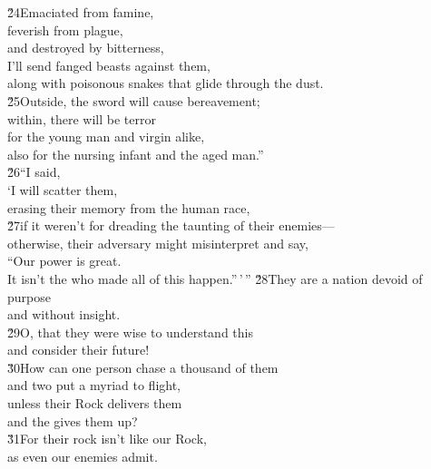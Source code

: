 \begin{poetry}
\poeml \v{24}Emaciated from famine, \\
\poemll    feverish from plague, \\
\poemll    and destroyed by bitterness, \\
\poeml I'll send fanged beasts against them, \\
\poemll    along with poisonous snakes that glide through the dust. \\
\poeml \v{25}Outside, the sword will cause bereavement; \\
\poemll    within, there will be terror \\
\poemlll       for the young man and virgin alike, \\
\poemlll       also for the nursing infant and the aged man.'' \\
\poeml \v{26}``I said, \\
\poeml `I will scatter them, \\
\poemll    erasing their memory from the human race, \\
\poeml \v{27}if it weren't for dreading the taunting of their enemies--- \\
\poemll    otherwise, their adversary might misinterpret and say, \\
\poeml ``Our power is great. \\
\poemll    It isn't the  who made all of this happen.''\,'\,''
\poeml \v{28}They are a nation devoid of purpose \\
\poemll    and without insight. \\
\poeml \v{29}O, that they were wise to understand this \\
\poemll    and consider their future! \\
\poeml \v{30}How can one person chase a thousand of them \\
\poemll    and two put a myriad to flight, \\
\poeml unless their Rock delivers them \\
\poemll    and the  gives them up? \\
\poeml \v{31}For their rock isn't like our Rock, \\
\poemll    as even our enemies admit. \\

\end{poetry}
